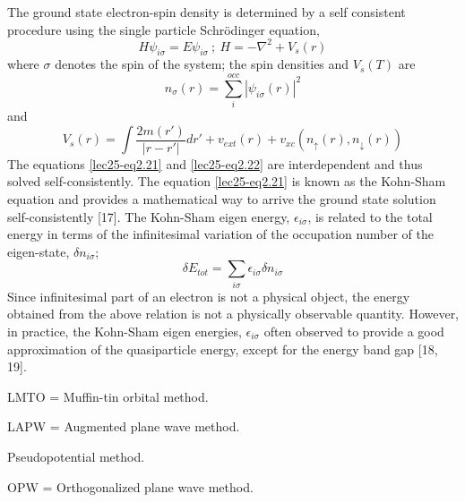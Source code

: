 The ground state electron-spin density is determined by a self consistent procedure using the single particle Schr\"odinger equation,
\begin{equation*}
H\psi_{i\sigma}=E\psi_{i\sigma} \ ; \ H=-\nabla^{2}+V_{s}(r)\tag{2.21}\label{lec25-eq2.21}
\end{equation*}
where $\sigma$ denotes the spin of the system; the spin densities and $V_{s}(T)$ are
\begin{equation*}
n_{\sigma}(r)=\sum\limits^{occ}_{i}|\psi_{i\sigma}(r)|^{2}\tag{2.22}\label{lec25-eq2.22}
\end{equation*}
and
\begin{equation*}
V_{s}(r)=\int \dfrac{2m(r')}{|r-r'|}dr'+v_{ext}(r)+v_{xc}(n_{\uparrow}(r),n_{\downarrow}(r))\tag{2.23}\label{lec25-eq2.23}
\end{equation*}
The equations \eqref{lec25-eq2.21} and \eqref{lec25-eq2.22} are interdependent and thus solved self-consistently. The equation \eqref{lec25-eq2.21} is known as the Kohn-Sham equation and provides a mathematical way to arrive the ground state solution self-consistently [17]. The Kohn-Sham eigen energy, $\epsilon_{i\sigma}$, is related to the total energy in terms of the infinitesimal variation of the occupation number of the eigen-state, $\delta n_{i\sigma}$;
\begin{equation*}
\delta E_{tot}=\sum\limits_{i\sigma}\epsilon_{i\sigma}\delta n_{i\sigma}\label{lec25-eq2.24}
\end{equation*}
Since infinitesimal part of an electron is not a physical object, the energy obtained from the above relation is not a physically observable quantity. However, in practice, the Kohn-Sham eigen energies, $\epsilon_{i\sigma}$ often observed to provide a good approximation of the quasiparticle energy, except for the energy band gap [18, 19].

LMTO = Muffin-tin orbital method.

LAPW = Augmented plane wave method.

Pseudopotential method.

OPW = Orthogonalized plane wave method.

